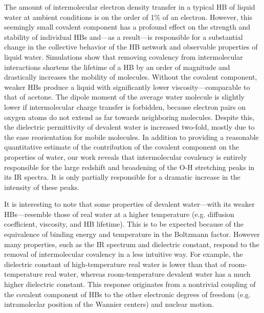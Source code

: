 \documentclass[journal=jacsat,manuscript=article]{achemso}
\begin{document}
The amount of intermolecular electron density transfer in a typical HB of liquid water at ambient conditions is on the order of 1\% of an electron. 
However, this seemingly small covalent component has a profound effect on the strength and stability of individual HBs and---as a result---is responsible for a substantial change in the collective behavior of the HB network and observable properties of liquid water. 
Simulations show that removing covalency from intermolecular interactions shortens the lifetime of a HB by an order of magnitude and drastically increases the mobility of molecules. 
Without the covalent component, weaker HBs produce a liquid with significantly lower viscosity---comparable to that of acetone. 
The dipole moment of the average water molecule is slightly lower if intermolecular charge transfer is forbidden, because electron pairs on oxygen atoms do not extend as far towards neighboring molecules. 
Despite this, the dielectric permittivity of devalent water is increased two-fold, mostly due to the ease reorientation for mobile molecules. 
In addition to providing a reasonable quantitative estimate of the contribution of the covalent component on the properties of water, our work reveals that intermolecular covalency is entirely responsible for the large redshift and broadening of the O-H stretching peaks in its IR spectra. It is only partially responsible for a dramatic increase in the intensity of these peaks. 

It is interesting to note that some properties of devalent water---with its weaker HBs---resemble those of real water at a higher temperature (e.g. diffusion coefficient, viscosity, and HB lifetime). 
This is to be expected because of the equivalence of binding energy and temperature in the Boltzmann factor. However many properties, such as the IR spectrum and dielectric constant, respond to the removal of intermolecular covalency in a less intuitive way. 
For example, the dielectric constant of high-temperature real water is lower than that of room-temperature real water, whereas room-temperature devalent water has a much higher dielectric constant. 
This response originates from a nontrivial coupling of the covalent component of HBs to the other electronic degrees of freedom (e.g. intramoleclar position of the Wannier centers) and nuclear motion.
\end{document}
